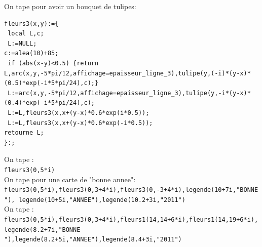 \documentclass[a4paper,11pt]{book}
\begin{document}
On tape pour avoir un bouquet de tulipes:
\begin{verbatim}
fleurs3(x,y):={
 local L,c;
 L:=NULL;
c:=alea(10)+85;
 if (abs(x-y)<0.5) {return L,arc(x,y,-5*pi/12,affichage=epaisseur_ligne_3),tulipe(y,(-i)*(y-x)*(0.5)*exp(-i*5*pi/24),c);}
 L:=arc(x,y,-5*pi/12,affichage=epaisseur_ligne_3),tulipe(y,-i*(y-x)*(0.4)*exp(-i*5*pi/24),c);
 L:=L,fleurs3(x,x+(y-x)*0.6*exp(i*0.5));
 L:=L,fleurs3(x,x+(y-x)*0.6*exp(-i*0.5));
retourne L;
}:;
\end{verbatim}
On tape :\\
{\tt fleurs3(0,5*i)}\\
On tape pour une carte de "bonne annee":\\
{\tt fleurs3(0,5*i),fleurs3(0,3+4*i),fleurs3(0,-3+4*i),legende(10+7i,"BONNE "),
legende(10+5i,"ANNEE"),legende(10.2+3i,"2011")}\\
On tape :\\
{\tt fleurs3(0,5*i),fleurs3(0,3+4*i),fleurs1(14,14+6*i),fleurs1(14,19+6*i),
legende(8.2+7i,"BONNE "),legende(8.2+5i,"ANNEE"),legende(8.4+3i,"2011")}\\

\begin{verbatim}
\end{verbatim}
\end{document}
